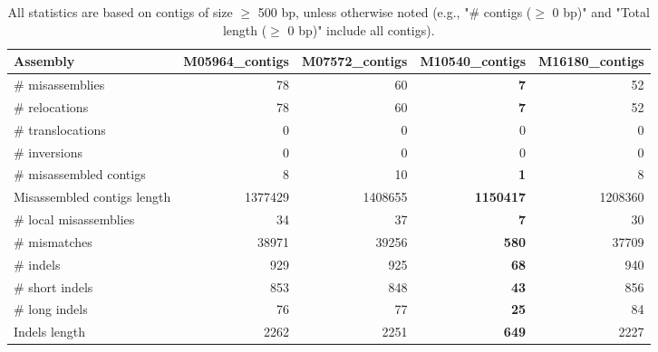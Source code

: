 \documentclass[12pt,a4paper]{article}
\begin{document}
\begin{table}[ht]
\begin{center}
\caption{All statistics are based on contigs of size $\geq$ 500 bp, unless otherwise noted (e.g., "\# contigs ($\geq$ 0 bp)" and "Total length ($\geq$ 0 bp)" include all contigs).}
\begin{tabular}{|l*{4}{|r}|}
\hline
Assembly & M05964\_contigs & M07572\_contigs & M10540\_contigs & M16180\_contigs \\ \hline
\# misassemblies & 78 & 60 & {\bf 7} & 52 \\ \hline
\hspace{5mm}\# relocations & 78 & 60 & {\bf 7} & 52 \\ \hline
\hspace{5mm}\# translocations & 0 & 0 & 0 & 0 \\ \hline
\hspace{5mm}\# inversions & 0 & 0 & 0 & 0 \\ \hline
\# misassembled contigs & 8 & 10 & {\bf 1} & 8 \\ \hline
Misassembled contigs length & 1377429 & 1408655 & {\bf 1150417} & 1208360 \\ \hline
\# local misassemblies & 34 & 37 & {\bf 7} & 30 \\ \hline
\# mismatches & 38971 & 39256 & {\bf 580} & 37709 \\ \hline
\# indels & 929 & 925 & {\bf 68} & 940 \\ \hline
\hspace{5mm}\# short indels & 853 & 848 & {\bf 43} & 856 \\ \hline
\hspace{5mm}\# long indels & 76 & 77 & {\bf 25} & 84 \\ \hline
Indels length & 2262 & 2251 & {\bf 649} & 2227 \\ \hline
\end{tabular}
\end{center}
\end{table}
\end{document}
